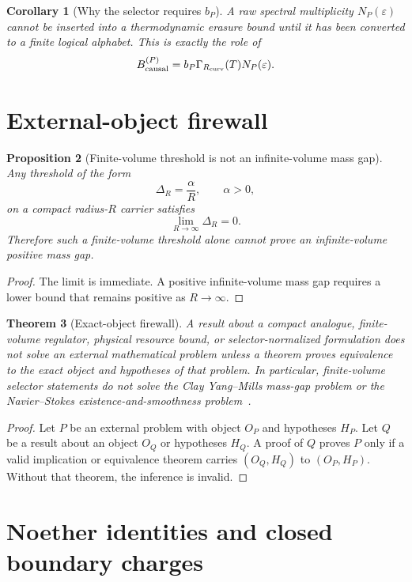\documentclass[11pt,a4paper]{article}
\newtheorem{theorem}{Theorem}[section]
\newtheorem{proposition}[theorem]{Proposition}
\newtheorem{corollary}[theorem]{Corollary}
\begin{document}
\begin{corollary}[Why the selector requires $b_P$]
A raw spectral multiplicity $N_P(\varepsilon)$ cannot be inserted into a thermodynamic erasure bound until it has been converted to a finite logical alphabet.  This is exactly the role of
\[
B_{\rm causal}^{(P)}=b_P\Gamma_{R_{\rm curv}}(T)N_P(\varepsilon).
\]
\end{corollary}


\section{External-object firewall}
\label{sec:threshold-firewall}

\begin{proposition}[Finite-volume threshold is not an infinite-volume mass gap]
Any threshold of the form
\[
\Delta_R=\frac{\alpha}{R},\qquad \alpha>0,
\]
on a compact radius-$R$ carrier satisfies
\[
\lim_{R\to\infty}\Delta_R=0.
\]
Therefore such a finite-volume threshold alone cannot prove an infinite-volume positive mass gap.
\end{proposition}
\begin{proof}
The limit is immediate.  A positive infinite-volume mass gap requires a lower bound that remains positive as $R\to\infty$.
\end{proof}

\begin{theorem}[Exact-object firewall]
A result about a compact analogue, finite-volume regulator, physical resource bound, or selector-normalized formulation does not solve an external mathematical problem unless a theorem proves equivalence to the exact object and hypotheses of that problem.  In particular, finite-volume selector statements do not solve the Clay Yang--Mills mass-gap problem or the Navier--Stokes existence-and-smoothness problem~\cite{ClayMillennium,ClayYM,ClayNS}.
\end{theorem}
\begin{proof}
Let $P$ be an external problem with object $O_P$ and hypotheses $H_P$.  Let $Q$ be a result about an object $O_Q$ or hypotheses $H_Q$.  A proof of $Q$ proves $P$ only if a valid implication or equivalence theorem carries $(O_Q,H_Q)$ to $(O_P,H_P)$.  Without that theorem, the inference is invalid.
\end{proof}

\section{Noether identities and closed boundary charges}
\label{sec:noether-boundary}
\end{document}
